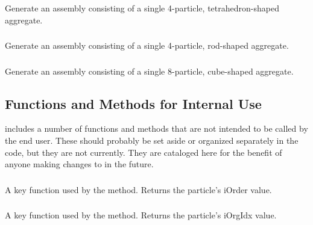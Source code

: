 \subsubsection{}
Generate an assembly consisting of a single 4-particle, tetrahedron-shaped aggregate.

\subsubsection{}
Generate an assembly consisting of a single 4-particle, rod-shaped aggregate.

\subsubsection{}
Generate an assembly consisting of a single 8-particle, cube-shaped aggregate.


\subsection{Functions and Methods for Internal Use}

 includes a number of functions and methods that are not intended to be called by the end user. These should probably be set aside or organized separately in the code, but they are not currently. They are cataloged here for the benefit of anyone making changes to  in the future. 

\subsubsection{}
A key function used by the  method. Returns the particle's iOrder value.

\subsubsection{}
A key function used by the  method. Returns the particle's iOrgIdx value.

